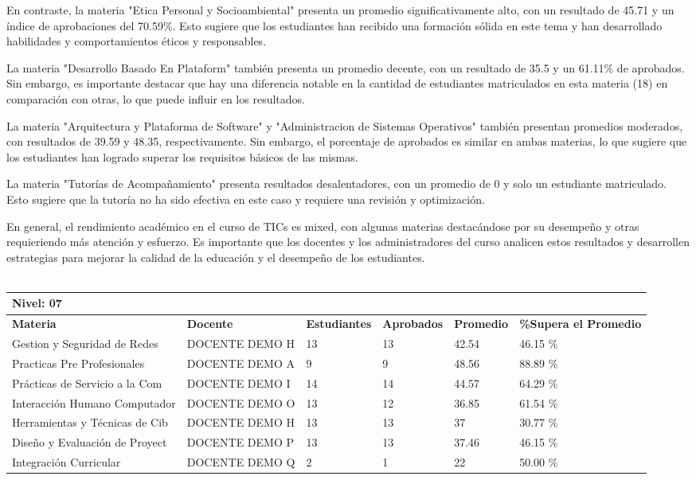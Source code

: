 En contraste, la materia "Etica Personal y Socioambiental" presenta un promedio significativamente alto, con un resultado de 45.71 y un índice de aprobaciones del 70.59\%. Esto sugiere que los estudiantes han recibido una formación sólida en este tema y han desarrollado habilidades y comportamientos éticos y responsables.

La materia "Desarrollo Basado En Plataform" también presenta un promedio decente, con un resultado de 35.5 y un 61.11\% de aprobados. Sin embargo, es importante destacar que hay una diferencia notable en la cantidad de estudiantes matriculados en esta materia (18) en comparación con otras, lo que puede influir en los resultados.

La materia "Arquitectura y Plataforma de Software" y "Administracion de Sistemas Operativos" también presentan promedios moderados, con resultados de 39.59 y 48.35, respectivamente. Sin embargo, el porcentaje de aprobados es similar en ambas materias, lo que sugiere que los estudiantes han logrado superar los requisitos básicos de las mismas.

La materia "Tutorías de Acompañamiento" presenta resultados desalentadores, con un promedio de 0 y solo un estudiante matriculado. Esto sugiere que la tutoría no ha sido efectiva en este caso y requiere una revisión y optimización.

En general, el rendimiento académico en el curso de TICs es mixed, con algunas materias destacándose por su desempeño y otras requieriendo más atención y esfuerzo. Es importante que los docentes y los administradores del curso analicen estos resultados y desarrollen estrategias para mejorar la calidad de la educación y el desempeño de los estudiantes.\\
\vspace{1cm}\\\small
\begin{tabularx}{\textwidth}{|p{2.5cm}|p{2.5cm}|X|X|X|X|}
\hline
\multicolumn{6}{|X|}{\textbf{Nivel: 07 }}\\\hline\textbf{Materia} & \textbf{Docente} & \textbf{Estudiantes} & \textbf{Aprobados} & \textbf{Promedio} & \textbf{\%Supera el Promedio} \\ \hline
Gestion y Seguridad de Redes & DOCENTE DEMO H & 13 & 13 & 42.54 & 46.15 \%\\ \hline
Practicas Pre Profesionales & DOCENTE DEMO A & 9 & 9 & 48.56 & 88.89 \%\\ \hline
Prácticas de Servicio a la Com & DOCENTE DEMO I & 14 & 14 & 44.57 & 64.29 \%\\ \hline
Interacción Humano Computador & DOCENTE DEMO O & 13 & 12 & 36.85 & 61.54 \%\\ \hline
Herramientas y Técnicas de Cib & DOCENTE DEMO H & 13 & 13 & 37 & 30.77 \%\\ \hline
Diseño y Evaluación de Proyect & DOCENTE DEMO P & 13 & 13 & 37.46 & 46.15 \%\\ \hline
Integración Curricular & DOCENTE DEMO Q & 2 & 1 & 22 & 50.00 \%\\ \hline
\end{tabularx}

